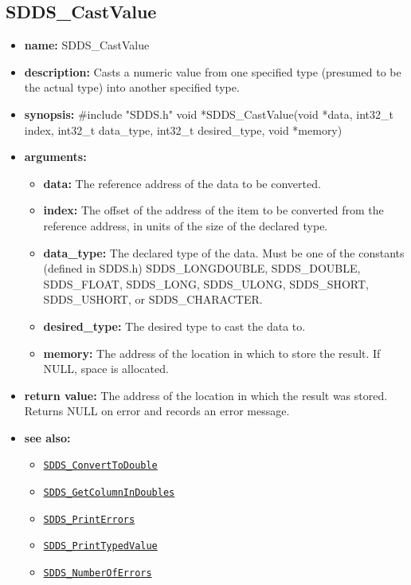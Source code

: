 \documentclass[11pt]{article}
\newcommand{\progref}[1]{\hyperref[SDDS_#1]{\tt SDDS\_#1}}
\begin{document}
\subsection{SDDS\_CastValue}
\label{SDDS_CastValue}

\begin{itemize}
\item {\bf name:}\newline
SDDS\_CastValue
\item {\bf description:}\newline
Casts a numeric value from one specified type (presumed to be the actual type) into another specified type.
\item {\bf synopsis:} \#include "SDDS.h"\newline
 void *SDDS\_CastValue(void *data, int32\_t index, int32\_t data\_type, int32\_t desired\_type, void *memory)
\item {\bf arguments:}
\begin{itemize}
\item {\bf data:} The reference address of the data to be converted.
\item {\bf index:} The offset of the address of the item to be converted from the reference address, in units of the size of the declared type.
\item {\bf data\_type:} The declared type of the data. Must be one of the constants (defined in SDDS.h) SDDS\_LONGDOUBLE, SDDS\_DOUBLE, SDDS\_FLOAT, SDDS\_LONG, SDDS\_ULONG, SDDS\_SHORT, SDDS\_USHORT, or SDDS\_CHARACTER.
\item {\bf desired\_type:} The desired type to cast the data to.
\item {\bf memory:} The address of the location in which to store the result. If NULL, space is allocated.
\end{itemize}
\item {\bf return value:}\newline
The address of the location in which the result was stored. Returns NULL on error and records an error message.
\item {\bf see also:}
\begin{itemize}
\item \progref{ConvertToDouble}
\item \progref{GetColumnInDoubles}
\item \progref{PrintErrors}
\item \progref{PrintTypedValue}
\item \progref{NumberOfErrors}
\end{itemize}
\end{itemize}
\end{document}
